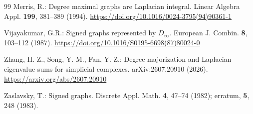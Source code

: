 \documentclass[11pt,reqno]{amsart}
\numberwithin{equation}{section}
\theoremstyle{plain}
\theoremstyle{definition}
\begin{document}
\begin{thebibliography}{99}
Merris, R.: Degree maximal graphs are Laplacian integral.
Linear Algebra Appl. \textbf{199}, 381--389 (1994).
\href{https://doi.org/10.1016/0024-3795(94)90361-1}{https://doi.org/10.1016/0024-3795(94)90361-1}

Vijayakumar, G.R.: Signed graphs represented by $D_\infty$.
European J. Combin. \textbf{8}, 103--112 (1987).
\href{https://doi.org/10.1016/S0195-6698(87)80024-0}{https://doi.org/10.1016/S0195-6698(87)80024-0}

Zhang, H.-Z., Song, Y.-M., Fan, Y.-Z.: Degree majorization and Laplacian eigenvalue sums for
simplicial complexes. arXiv:2607.20910 (2026).
\href{https://arxiv.org/abs/2607.20910}{https://arxiv.org/abs/2607.20910}

Zaslavsky, T.: Signed graphs. Discrete Appl. Math. \textbf{4}, 47--74 (1982);
erratum, \textbf{5}, 248 (1983).

\end{thebibliography}
\end{document}
